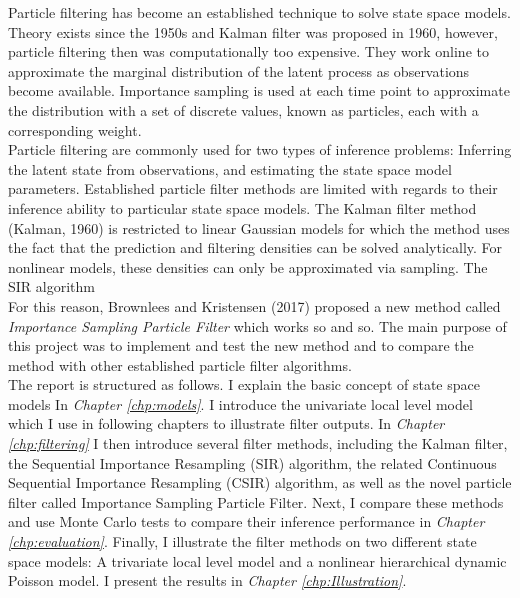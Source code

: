 \documentclass[11pt, oneside]{scrreprt}   	%
\begin{document}
Particle filtering has become an established technique to solve state space models. Theory exists since the 1950s and Kalman filter was proposed in 1960, however, particle filtering then was computationally too expensive. They work online to approximate the marginal distribution of the latent process as observations become available. Importance sampling is used at each time point to approximate the distribution with a set of discrete values, known as particles, each with a corresponding weight.\\

Particle filtering are commonly used for two types of inference problems: Inferring the latent state from observations, and estimating the state space model parameters. Established particle filter methods are limited with regards to their inference ability to particular state space models. The Kalman filter method (Kalman, 1960) is restricted to linear Gaussian models for which the method uses the fact that the prediction and filtering densities can be solved analytically. For nonlinear models, these densities can only be approximated via sampling. The SIR algorithm \\

For this reason, Brownlees and Kristensen (2017) proposed a new method called \textit{Importance Sampling Particle Filter} which works so and so. The main purpose of this project was to implement and test the new method and to compare the method with other established particle filter algorithms.\\

%
The report is structured as follows. I explain the basic concept of state space models In \textit{Chapter \ref{chp:models}}. I introduce the univariate local level model which I use in following chapters to illustrate filter outputs. In \textit{Chapter \ref{chp:filtering}} I then introduce several filter methods, including the Kalman filter, the Sequential Importance Resampling (SIR) algorithm, the related Continuous Sequential Importance Resampling (CSIR) algorithm, as well as the novel particle filter called Importance Sampling Particle Filter. Next, I compare these methods and use Monte Carlo tests to compare their inference performance in \textit{Chapter \ref{chp:evaluation}}. Finally, I illustrate the filter methods on two different state space models: A trivariate local level model and a nonlinear hierarchical dynamic Poisson model. I present the results in \textit{Chapter \ref{chp:Illustration}}.\\
\end{document}
